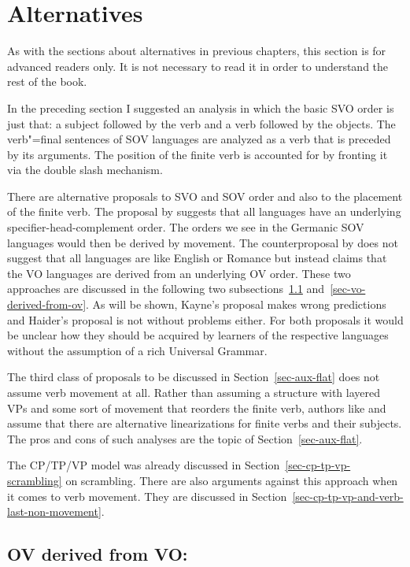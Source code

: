 \section{Alternatives}

As with the sections about alternatives in previous chapters, this section is for advanced readers
only. It is not necessary to read it in order to understand the rest of the book.

In the preceding section I suggested an analysis in which the basic SVO order is just that: a
subject followed by the verb and a verb followed by the objects. The verb"=final sentences of SOV
languages are analyzed as a verb that is preceded by its arguments. The position of the finite verb
is accounted for by fronting it via the double slash mechanism.

There are alternative proposals to SVO and SOV order and also to the placement of the finite
verb. The proposal by \citet{Kayne94a-u} suggests that all languages have an underlying
specifier-head-complement order. The orders we see in the Germanic SOV languages would then be
derived by movement. The counterproposal by \citet{Haider2000a,Haider2020a} does not suggest that all languages are
like English or Romance but instead claims that the VO languages are derived from an underlying OV
order. These two approaches are discussed in the following two subsections~\ref{sec-ov-derived-from-vo} and~\ref{sec-vo-derived-from-ov}. As will be shown,
Kayne's proposal makes wrong predictions and Haider's proposal is not without problems either. For
both proposals it would be unclear how they should be acquired by learners of the respective
languages without the assumption of a rich Universal Grammar.

The third class of proposals to be discussed in Section~\ref{sec-aux-flat} does not assume verb movement at
all. Rather than assuming a structure with layered VPs and some sort of movement that reorders the
finite verb, authors like \citet*{GKPS85a} and \citet{Sag2020a} assume that there are alternative
linearizations for finite verbs and their subjects. The pros and cons of such analyses are the topic
of Section~\ref{sec-aux-flat}.

The CP/TP/VP model was already discussed in Section~\ref{sec-cp-tp-vp-scrambling} on scrambling. 
There are also arguments against this approach when it comes to verb movement. They are discussed in
Section~\ref{sec-cp-tp-vp-and-verb-last-non-movement}.  

\subsection{OV derived from VO: \citet{Kayne94a-u}}
\label{sec-ov-derived-from-vo}



